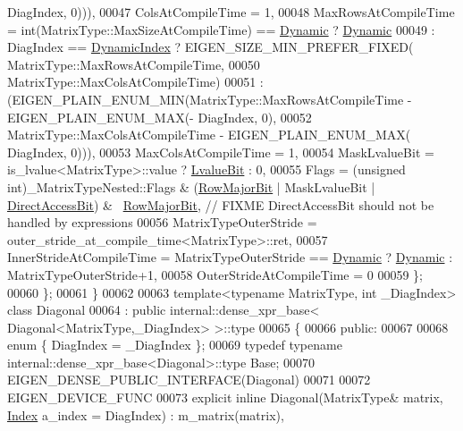 \begin{DoxyCode}
      DiagIndex, 0))),
00047     ColsAtCompileTime = 1,
00048     MaxRowsAtCompileTime = \textcolor{keywordtype}{int}(MatrixType::MaxSizeAtCompileTime) == \hyperlink{namespace_eigen_ad81fa7195215a0ce30017dfac309f0b2}{Dynamic} ? 
      \hyperlink{namespace_eigen_ad81fa7195215a0ce30017dfac309f0b2}{Dynamic}
00049                          : DiagIndex == \hyperlink{namespace_eigen_a73c597189a4a99127175e8167c456fff}{DynamicIndex} ? EIGEN\_SIZE\_MIN\_PREFER\_FIXED(
      MatrixType::MaxRowsAtCompileTime,
00050                                                                               
      MatrixType::MaxColsAtCompileTime)
00051                          : (EIGEN\_PLAIN\_ENUM\_MIN(MatrixType::MaxRowsAtCompileTime - EIGEN\_PLAIN\_ENUM\_MAX(-
      DiagIndex, 0),
00052                                                  MatrixType::MaxColsAtCompileTime - EIGEN\_PLAIN\_ENUM\_MAX( 
      DiagIndex, 0))),
00053     MaxColsAtCompileTime = 1,
00054     MaskLvalueBit = is\_lvalue<MatrixType>::value ? \hyperlink{group__flags_gae2c323957f20dfdc6cb8f44428eaec1a}{LvalueBit} : 0,
00055     Flags = (unsigned int)\_MatrixTypeNested::Flags & (\hyperlink{group__flags_gae4f56c2a60bbe4bd2e44c5b19cbe8762}{RowMajorBit} | MaskLvalueBit | 
      \hyperlink{group__flags_gabf1e9d0516a933445a4c307ad8f14915}{DirectAccessBit}) & ~\hyperlink{group__flags_gae4f56c2a60bbe4bd2e44c5b19cbe8762}{RowMajorBit}, \textcolor{comment}{// FIXME DirectAccessBit should not be handled
       by expressions}
00056     MatrixTypeOuterStride = outer\_stride\_at\_compile\_time<MatrixType>::ret,
00057     InnerStrideAtCompileTime = MatrixTypeOuterStride == \hyperlink{namespace_eigen_ad81fa7195215a0ce30017dfac309f0b2}{Dynamic} ? \hyperlink{namespace_eigen_ad81fa7195215a0ce30017dfac309f0b2}{Dynamic} : 
      MatrixTypeOuterStride+1,
00058     OuterStrideAtCompileTime = 0
00059   \};
00060 \};
00061 \}
00062 
00063 \textcolor{keyword}{template}<\textcolor{keyword}{typename} MatrixType, \textcolor{keywordtype}{int} \_DiagIndex> \textcolor{keyword}{class }Diagonal
00064    : \textcolor{keyword}{public} internal::dense\_xpr\_base< Diagonal<MatrixType,\_DiagIndex> >::type
00065 \{
00066   \textcolor{keyword}{public}:
00067 
00068     \textcolor{keyword}{enum} \{ DiagIndex = \_DiagIndex \};
00069     \textcolor{keyword}{typedef} \textcolor{keyword}{typename} internal::dense\_xpr\_base<Diagonal>::type Base;
00070     EIGEN\_DENSE\_PUBLIC\_INTERFACE(Diagonal)
00071 
00072     EIGEN\_DEVICE\_FUNC
00073     \textcolor{keyword}{explicit} \textcolor{keyword}{inline} Diagonal(MatrixType& matrix, \hyperlink{namespace_eigen_a62e77e0933482dafde8fe197d9a2cfde}{Index} a\_index = DiagIndex) : m\_matrix(matrix), 

\end{DoxyCode}
